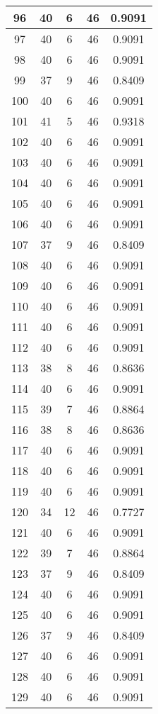 \documentclass[letterpaper, 12pt]{article}
\begin{document}
\begin{longtable}{|c|c|c|c|c|}
\hline
96 & 40 & 6 & 46 & 0.9091 \\
\hline
97 & 40 & 6 & 46 & 0.9091 \\
\hline
98 & 40 & 6 & 46 & 0.9091 \\
\hline
99 & 37 & 9 & 46 & 0.8409 \\
\hline
100 & 40 & 6 & 46 & 0.9091 \\
\hline
101 & 41 & 5 & 46 & 0.9318 \\
\hline
102 & 40 & 6 & 46 & 0.9091 \\
\hline
103 & 40 & 6 & 46 & 0.9091 \\
\hline
104 & 40 & 6 & 46 & 0.9091 \\
\hline
105 & 40 & 6 & 46 & 0.9091 \\
\hline
106 & 40 & 6 & 46 & 0.9091 \\
\hline
107 & 37 & 9 & 46 & 0.8409 \\
\hline
108 & 40 & 6 & 46 & 0.9091 \\
\hline
109 & 40 & 6 & 46 & 0.9091 \\
\hline
110 & 40 & 6 & 46 & 0.9091 \\
\hline
111 & 40 & 6 & 46 & 0.9091 \\
\hline
112 & 40 & 6 & 46 & 0.9091 \\
\hline
113 & 38 & 8 & 46 & 0.8636 \\
\hline
114 & 40 & 6 & 46 & 0.9091 \\
\hline
115 & 39 & 7 & 46 & 0.8864 \\
\hline
116 & 38 & 8 & 46 & 0.8636 \\
\hline
117 & 40 & 6 & 46 & 0.9091 \\
\hline
118 & 40 & 6 & 46 & 0.9091 \\
\hline
119 & 40 & 6 & 46 & 0.9091 \\
\hline
120 & 34 & 12 & 46 & 0.7727 \\
\hline
121 & 40 & 6 & 46 & 0.9091 \\
\hline
122 & 39 & 7 & 46 & 0.8864 \\
\hline
123 & 37 & 9 & 46 & 0.8409 \\
\hline
124 & 40 & 6 & 46 & 0.9091 \\
\hline
125 & 40 & 6 & 46 & 0.9091 \\
\hline
126 & 37 & 9 & 46 & 0.8409 \\
\hline
127 & 40 & 6 & 46 & 0.9091 \\
\hline
128 & 40 & 6 & 46 & 0.9091 \\
\hline
129 & 40 & 6 & 46 & 0.9091 \\

\end{longtable}
\end{document}
